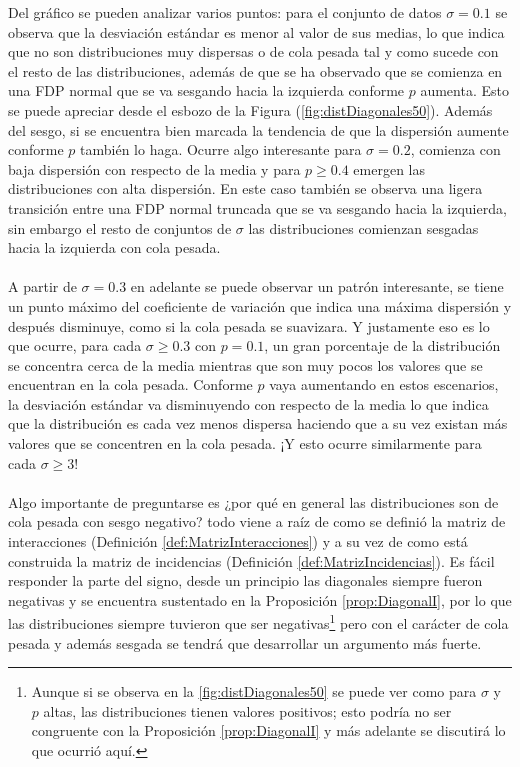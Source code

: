 Del gráfico se pueden analizar varios puntos: para el conjunto de datos $\sigma=0.1$ se observa que la desviación estándar es menor al valor de sus medias, lo que indica que no son distribuciones muy dispersas o de cola pesada tal y como sucede con el resto de las distribuciones, además de que se ha observado que se comienza en una FDP normal que se va sesgando hacia la izquierda conforme $p$ aumenta. Esto se puede apreciar desde el esbozo de la Figura (\ref{fig:distDiagonales50}). Además del sesgo, si se encuentra bien marcada la tendencia de que la dispersión aumente conforme $p$ también lo haga. Ocurre algo interesante para $\sigma=0.2$, comienza con baja dispersión con respecto de la media y para $p\geq0.4$ emergen las distribuciones con alta dispersión. En este caso también se observa una ligera transición entre una FDP normal truncada que se va sesgando hacia la izquierda, sin embargo el resto de conjuntos de $\sigma$ las distribuciones comienzan sesgadas hacia la izquierda con cola pesada.\\
\\
A partir de $\sigma=0.3$ en adelante se puede observar un patrón interesante, se tiene un punto máximo del coeficiente de variación que indica una máxima dispersión y después disminuye, como si la cola pesada se suavizara. Y justamente eso es lo que ocurre, para cada $\sigma\geq 0.3$ con $p=0.1$, un gran porcentaje de la distribución se concentra cerca de la media mientras que son muy pocos los valores que se encuentran en la cola pesada. Conforme $p$ vaya aumentando en estos escenarios, la desviación estándar va disminuyendo con respecto de la media lo que indica que la distribución es cada vez menos dispersa haciendo que a su vez existan más valores que se concentren en la cola pesada. ¡Y esto ocurre similarmente para cada $\sigma\geq 3$!\\
\\
Algo importante de preguntarse es ¿por qué en general las distribuciones son de cola pesada con sesgo negativo? todo viene a raíz de como se definió la matriz de interacciones (Definición \ref{def:MatrizInteracciones}) y a su vez de como está construida la matriz de incidencias (Definición \ref{def:MatrizIncidencias}). Es fácil responder la parte del signo, desde un principio las diagonales siempre fueron negativas y se encuentra sustentado en la Proposición \ref{prop:DiagonalI}, por lo que las distribuciones siempre tuvieron que ser negativas\footnote{Aunque si se observa en la \ref{fig:distDiagonales50} se puede ver como para $\sigma$ y $p$ altas, las distribuciones tienen valores positivos; esto podría no ser congruente con la Proposición \ref{prop:DiagonalI} y más adelante se discutirá lo que ocurrió aquí.} pero con el carácter de cola pesada y además sesgada se tendrá que desarrollar un argumento más fuerte.\\
